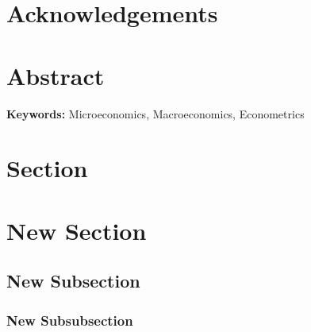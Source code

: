 \documentclass[12pt]{article}
\numberwithin{figure}{section}
\numberwithin{table}{section}
\begin{document}
\newpage
\listoftables 
{} %



\newpage
\section*{Acknowledgements}
\blindtext 



\newpage
\section*{Abstract} %
\blindtext
\newline
\newline
\textbf{Keywords:} Microeconomics, Macroeconomics, Econometrics




\newpage
\section{Section}
\label{sectionlabel}

\blindtext

\blindtext

\newpage




\newpage
\section{New Section}
\subsection{New Subsection} 
\subsubsection{New Subsubsection} 
\end{document}
